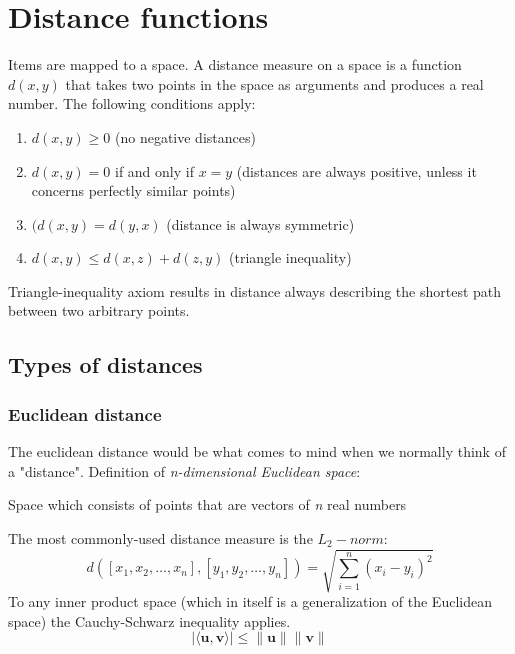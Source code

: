 \section{Distance functions}
Items are mapped to a space.  A distance measure on a space is a function $d(x,y)$ that takes two points in the space as arguments and produces a real number. The following conditions apply:
\begin{enumerate}
    \item $d(x,y) \geq 0 $ (no negative distances)
    \item $d(x,y) = 0$ if and only if $x = y$ (distances are always positive, unless it concerns perfectly similar points)
    \item $(d(x,y) = d(y,x) $ (distance is always symmetric)
    \item $d(x,y) \leq d(x,z) + d(z,y)$ (triangle inequality)
    
\end{enumerate}

Triangle-inequality axiom results in distance always describing the shortest path between two arbitrary points. 

\subsection{Types of distances}
\subsubsection{Euclidean distance}
The euclidean distance would be what comes to mind when we normally think of a "distance". 
\newline
Definition of \textit{n-dimensional Euclidean space}:
\begin{center}

Space which consists of points that are vectors of \textit{n} real numbers
\end{center}

The most commonly-used distance measure is the $L_{2}-norm$:
\begin{equation}
d\left(\left[x_{1}, x_{2}, \ldots, x_{n}\right],\left[y_{1}, y_{2}, \ldots, y_{n}\right]\right)=\sqrt{\sum_{i=1}^{n}\left(x_{i}-y_{i}\right)^{2}}
\end{equation}
To any inner product space (which in itself is a generalization of the Euclidean space) the Cauchy-Schwarz inequality applies. 
\begin{equation}
|\langle\mathbf{u}, \mathbf{v}\rangle| \leq\|\mathbf{u}\|\|\mathbf{v}\|
\end{equation}

